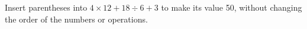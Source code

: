 Insert parentheses into $4\times12+18\div6+3$ to make its value 50, without changing the order of the numbers or operations.
